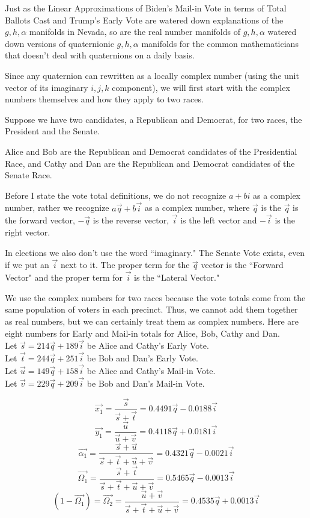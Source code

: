 \documentclass[preprint,13pt]{elsarticle}
\begin{document}
Just as the Linear Approximations of Biden's Mail-in Vote in terms of Total Ballots Cast and Trump's Early Vote are watered down explanations of the $g,h,\alpha$ manifolds in Nevada, so are the real number manifolds of $g,h,\alpha$ watered down versions of quaternionic $g,h,\alpha$ manifolds for the common mathematicians that doesn't deal with quaternions on a daily basis.

Since any quaternion can rewritten as a locally complex number (using the unit vector of its imaginary $i,j,k$ component), we will first start with the complex numbers themselves and how they apply to two races.

Suppose we have two candidates, a Republican and Democrat, for two races, the President and the Senate.

Alice and Bob are the Republican and Democrat candidates of the Presidential Race, and Cathy and Dan are the Republican and Democrat candidates of the Senate Race.

Before I state the vote total definitions, we do not recognize $a+bi$ as a complex number, rather we recognize $a\vec{q}+b\vec{i}$ as a complex number, where $\vec{q}$ is the $\vec{q}$ is the forward vector, $-\vec{q}$ is the reverse vector, $\vec{i}$ is the left vector and $-\vec{i}$ is the right vector. 

In elections we also don't use the word ``imaginary." The Senate Vote exists, even if we put an $\vec{i}$ next to it. The proper term for the $\vec{q}$ vector is the ``Forward Vector" and the proper term for $\vec{i}$ is the ``Lateral Vector."

We use the complex numbers for two races because the vote totals come from the same population of voters in each precinct. Thus, we cannot add them together as real numbers, but we can certainly treat them as complex numbers.
\newpage
Here are eight numbers for Early and Mail-in totals for Alice, Bob, Cathy and Dan.\\
Let $\vec{s}=214\vec{q}+189\vec{i}$ be Alice and Cathy's Early Vote.\\
Let $\vec{t}=244\vec{q}+251\vec{i}$ be Bob and Dan's Early Vote.\\
Let $\vec{u}=149\vec{q}+158\vec{i}$ be Alice and Cathy's Mail-in Vote.\\
Let $\vec{v}=229\vec{q}+209\vec{i}$ be Bob and Dan's Mail-in Vote.

$$\vec{x_{1}}=\frac{\vec{s}}{\vec{s}+\vec{t}}=0.4491\vec{q}-0.0188\vec{i}$$
$$\vec{y_{1}}=\frac{\vec{u}}{\vec{u}+\vec{v}}=0.4118\vec{q}+0.0181\vec{i}$$
$$\vec{\alpha_{1}}=\frac{\vec{s}+\vec{u}}{\vec{s}+\vec{t}+\vec{u}+\vec{v}}=0.4321\vec{q}-0.0021\vec{i}$$
$$\vec{\Omega_{1}}=\frac{\vec{s}+\vec{t}}{\vec{s}+\vec{t}+\vec{u}+\vec{v}}=0.5465\vec{q}-0.0013\vec{i}$$
$$(1-\vec{\Omega_{1}})=\vec{\Omega_{2}}=\frac{\vec{u}+\vec{v}}{\vec{s}+\vec{t}+\vec{u}+\vec{v}}=0.4535\vec{q}+0.0013\vec{i}$$
\end{document}
